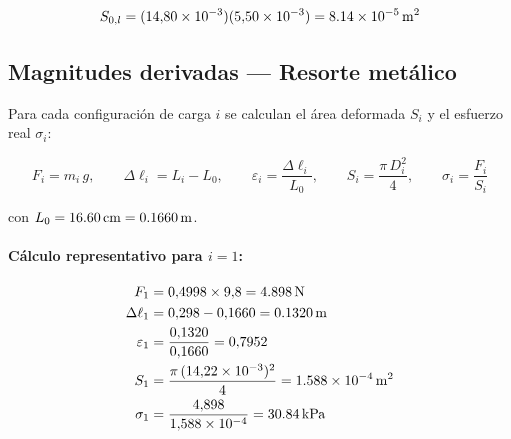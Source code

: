 \begin{equation*}
    S_{0,l} = (14{,}80\times10^{-3})(5{,}50\times10^{-3})
             = \qty{8{,}14e-5}{m^2}
\end{equation*}

\subsection{Magnitudes derivadas — Resorte metálico}

Para cada configuración de carga $i$ se calculan el área deformada $S_i$ y el esfuerzo real $\sigma_i$:

\begin{equation}
    F_i = m_i\,g, \qquad
    \Delta\ell_i = L_i - L_0, \qquad
    \varepsilon_i = \frac{\Delta\ell_i}{L_0}, \qquad
    S_i = \frac{\pi\,D_i^2}{4}, \qquad
    \sigma_i = \frac{F_i}{S_i}
    \label{eq:mag_deriv}
\end{equation}

con $L_0 = \qty{16{,}60}{cm} = \qty{0{,}1660}{m}$.

\paragraph{Cálculo representativo para $i = 1$:}

\begin{align*}
    F_1        &= 0{,}4998 \times 9{,}8 = \qty{4{,}898}{N}\\
    \Delta\ell_1 &= 0{,}298 - 0{,}1660  = \qty{0{,}1320}{m}\\
    \varepsilon_1 &= \frac{0{,}1320}{0{,}1660} = 0{,}7952\\
    S_1 &= \frac{\pi\,(14{,}22\times10^{-3})^2}{4} = \qty{1{,}588e-4}{m^2}\\
    \sigma_1  &= \frac{4{,}898}{1{,}588\times10^{-4}} = \qty{30{,}84}{kPa}
\end{align*}

